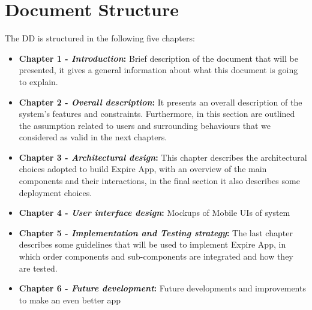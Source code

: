 \section{Document Structure}

The DD is structured in the following five chapters:
\begin{itemize}
\item \textbf{Chapter 1 -  \textit{Introduction}:}
Brief description of the document that will be presented, it gives a general information about what this document is going to explain.
\item \textbf{Chapter 2 -  \textit{Overall description}:}
It presents an overall description of the system’s features and constraints. Furthermore, in this section are outlined the assumption related to users and surrounding behaviours that we considered as valid in the next chapters.
\item \textbf{Chapter 3 -  \textit{Architectural design}:} 
This chapter describes the architectural choices adopted to build Expire App, with an overview of the
main components and their interactions, in the final section it also describes some deployment choices.
\item \textbf{Chapter 4 -  \textit{User interface design}:}
Mockups of Mobile UIs of system
\item \textbf{Chapter 5 -  \textit{Implementation and Testing strategy}:}
The last chapter describes some guidelines that will be used to implement
Expire App, in which order components and sub-components are integrated and how they are tested.
\item \textbf{Chapter 6 -  \textit{Future development}:}
Future developments and improvements to make an even better app
\end{itemize}